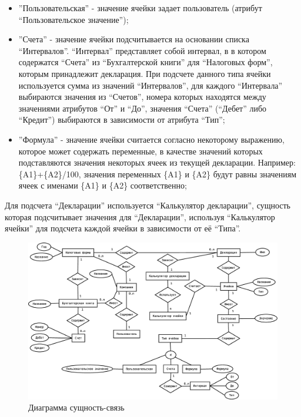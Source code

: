 \documentclass[14pt,a4paper]{reportmod}
\begin{document}
\begin{itemize}
  \item''Пользовательская'' - значение ячейки задает пользователь (атрибут ``Пользовательское значение'');
  \item''Счета'' - значение ячейки подсчитывается на основании списка ``Интервалов''. ``Интервал'' представляет собой интервал, в в котором содержатся ``Счета'' из ``Бухгалтерской книги'' для ``Налоговых форм'', которым принадлежит декларация. При подсчете данного типа ячейки используется сумма из значений ``Интервалов'', для каждого ``Интервала'' выбираются значения из ``Счетов'', номера которых находятся между значениями атрибутов ``От'' и ``До'', значения ``Счета'' (``Дебет'' либо ``Кредит'') выбираются в зависимости от атрибута ``Тип'';
  \item''Формула'' - значение ячейки считается согласно некоторому выражению, которое может содержать переменные, в качестве значений которых подставляются значения некоторых ячеек из текущей декларации. Например: \{A1\}+\{A2\}/100, значения переменных \{A1\} и \{A2\} будут равны значениям ячеек с именами \{A1\} и \{A2\} соответственно;
\end{itemize}

Для подсчета ``Декларации'' используется ``Калькулятор декларации'', сущность которая подсчитывает значения для ``Декларации'', используя ``Калькулятор ячейки'' для подсчета каждой ячейки в зависимости от её ``Типа''.

\begin{figure}
  \centering
  \includegraphics[scale=0.4]{uml/entity_pretty}
  \caption{Диаграмма сущность-связь}
  \label{pic:er_diagram}
\end{figure}
\end{document}

